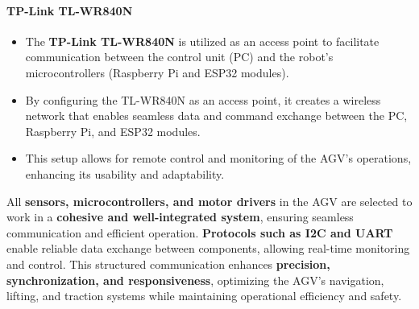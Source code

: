 \documentclass[../../main]{subfiles}
\begin{document}
\paragraph{TP-Link TL-WR840N}
\begin{itemize}
    \item The \textbf{TP-Link TL-WR840N} is utilized as an access point 
    to facilitate communication between the control unit (PC) and the 
    robot's microcontrollers (Raspberry Pi and ESP32 modules).
    \item By configuring the TL-WR840N as an access point, it creates 
    a wireless network that enables seamless data and command exchange 
    between the PC, Raspberry Pi, and ESP32 modules.
    \item This setup allows for remote control and monitoring of the 
    AGV's operations, enhancing its usability and adaptability.
\end{itemize}

All \textbf{sensors, microcontrollers, and motor drivers} in the AGV 
are selected to work in a \textbf{cohesive and well-integrated system}, 
ensuring seamless communication and efficient operation. 
\textbf{Protocols such as I2C and UART} enable reliable data exchange 
between components, allowing real-time monitoring and control. 
This structured communication enhances \textbf{precision, synchronization, 
and responsiveness}, optimizing the AGV’s navigation, lifting, and 
traction systems while maintaining operational efficiency and safety.
    



  
  
  
\end{document}
